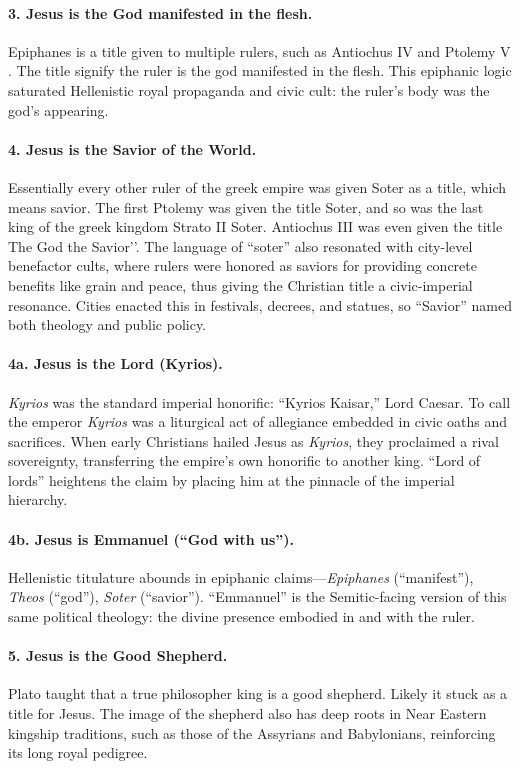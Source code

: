 \paragraph{3.
Jesus is the God manifested in the flesh.}\label{par:jesus-is-the-god-manifested-in-the-flesh.}
Epiphanes is a title given to multiple rulers, such as Antiochus IV and Ptolemy V .
The title signify the ruler is the god manifested in the flesh.
This epiphanic logic saturated Hellenistic royal propaganda and civic cult: the ruler’s body was the god’s appearing.

\paragraph{4.
Jesus is the Savior of the World.}\label{par:jesus-is-the-savior-of-the-world.}
Essentially every other ruler of the greek empire was given Soter as a title, which means savior.
The first Ptolemy was given the title Soter, and so was the last king of the greek kingdom Strato II Soter.
Antiochus III was even given the title The God the Savior’’.
The language of “soter” also resonated with city-level benefactor cults, where rulers were honored as saviors for providing concrete benefits like grain and peace, thus giving the Christian title a civic-imperial resonance.
Cities enacted this in festivals, decrees, and statues, so “Savior” named both theology and public policy.
\paragraph{4a.
Jesus is the Lord (Kyrios).}\label{par:jesus-is-the-lord-kyrios}
\emph{Kyrios} was the standard imperial honorific: “Kyrios Kaisar,” Lord Caesar. To call the emperor \emph{Kyrios} was a liturgical act of allegiance embedded in civic oaths and sacrifices. When early Christians hailed Jesus as \emph{Kyrios}, they proclaimed a rival sovereignty, transferring the empire’s own honorific to another king. “Lord of lords” heightens the claim by placing him at the pinnacle of the imperial hierarchy.
\paragraph{4b.
Jesus is Emmanuel (“God with us”).}\label{par:jesus-is-emmanuel}
Hellenistic titulature abounds in epiphanic claims—\emph{Epiphanes} (“manifest”), \emph{Theos} (“god”), \emph{Soter} (“savior”).
“Emmanuel” is the Semitic-facing version of this same political theology: the divine presence embodied in and with the ruler.
\paragraph{5.
Jesus is the Good Shepherd.}\label{par:jesus-is-the-good-shepherd.}
Plato taught that a true philosopher king is a good shepherd.
Likely it stuck as a title for Jesus.
The image of the shepherd also has deep roots in Near Eastern kingship traditions, such as those of the Assyrians and Babylonians, reinforcing its long royal pedigree.


